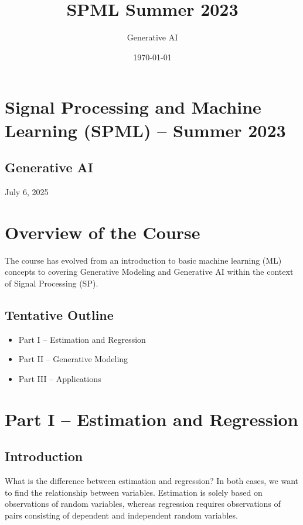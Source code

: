 \documentclass[a4paper, 11pt]{article}
\title{SPML Summer 2023}
\author{Generative AI}
\date{\today}
\begin{document}
\maketitle
\section{Signal Processing and Machine Learning (SPML) -- Summer 2023}

\subsection{Generative AI}

\begin{flushright}
July 6, 2025
\end{flushright}

\section{Overview of the Course}

The course has evolved from an introduction to basic machine learning (ML) concepts to covering Generative Modeling and Generative AI within the context of Signal Processing (SP).

\subsection{Tentative Outline}
\begin{itemize}
    \item Part I -- Estimation and Regression
    \item Part II -- Generative Modeling
    \item Part III -- Applications
\end{itemize}

\section{Part I -- Estimation and Regression}

\subsection{Introduction}

What is the difference between estimation and regression? In both cases, we want to find the relationship between variables. Estimation is solely based on observations of random variables, whereas regression requires observations of pairs consisting of dependent and independent random variables.
\end{document}
